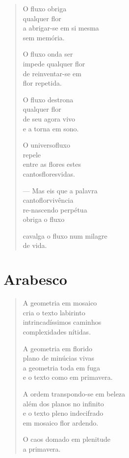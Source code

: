 \begin{verse}
O fluxo obriga\\
qualquer flor\\
a abrigar-se em si mesma\\
sem memória.

O fluxo onda ser\\
impede qualquer flor\\
de reinventar-se em\\
flor repetida.

O fluxo destrona\\
qualquer flor\\
de seu agora vivo\\
e a torna em sono.

O universofluxo\\
repele\\
entre as flores estes\\
cantosfloresvidas.

--- Mas eis que a palavra\\
cantoflorvivência\\
re-nascendo perpétua\\
obriga o fluxo

cavalga o fluxo num milagre\\
de vida.
\end{verse}

\chapter{Arabesco}

\begin{verse}
A geometria em mosaico\\
cria o texto labirinto\\
intrincadíssimos caminhos\\
complexidades nítidas.

A geometria em florido\\
plano de minúcias vivas\\
a geometria toda em fuga\\
e o texto como em primavera.

A ordem transpondo-se em beleza\\
além dos planos no infinito\\
e o texto pleno indecifrado\\
em mosaico flor ardendo.

O caos domado em plenitude\\
\hfill{}a primavera.
\end{verse}

